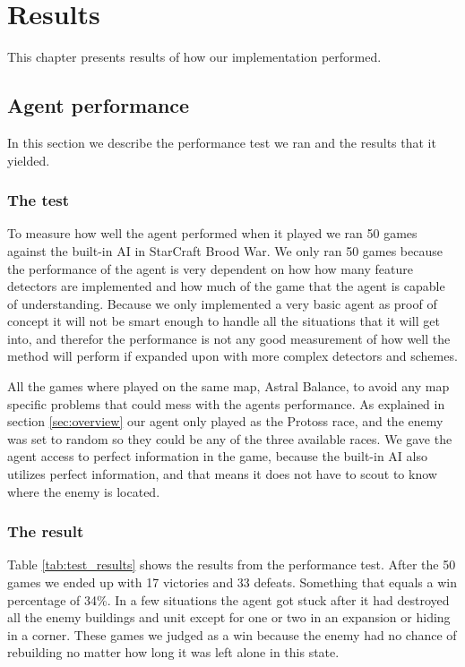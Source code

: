 
\chapter{Results}
This chapter presents results of how our implementation performed.

\section{Agent performance}
In this section we describe the performance test we ran and the results that it yielded.
\subsection{The test}
To measure how well the agent performed when it played  we ran 50 games against the built-in AI in StarCraft Brood War. We only ran 50 games because the performance of the agent is very dependent on how how many feature detectors are implemented and how much of the game that the agent is capable of understanding. Because we only implemented a very basic agent as proof of concept it will not be smart enough to handle all the situations that it will get into, and therefor the performance is not any good measurement of how well the method will perform if expanded upon with more complex detectors and schemes. 
	
All the games where played on the same map, Astral Balance, to avoid any map specific problems that could mess with the agents performance. As explained in section \ref{sec:overview} our agent only played as the Protoss race, and the enemy was set to random so they could be any of the three available races. We gave the agent access to perfect information in the game, because the built-in AI also utilizes perfect information, and that means it does not have to scout to know where the enemy is located.

\subsection{The result}
Table \ref{tab:test_results} shows the results from the performance test. After the 50 games we ended up with 17 victories and 33 defeats. Something that equals a win percentage of 34\%. In a few situations the agent got stuck after it had destroyed all the enemy buildings and unit except for one or two in an expansion or hiding in a corner. These games we judged as a win because the enemy had no chance of rebuilding no matter how long it was left alone in this state.

